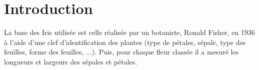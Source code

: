 \def\xxactivite{TD}
\def\xxauteur{\textsl{Xavier Pessoles}}

\def\xxnumchapitre{Chapitre 1 \vspace{.2cm}}
\def\xxchapitre{\hspace{.12cm} Introduction}


\def\xxtitreexo{Classification des Iris}
\def\xxsourceexo{\url{https://makina-corpus.com/blog/metier/2017/initiation-au-machine-learning-avec-python-pratique}}

\def\xxcompetences{%
\textsl{%
\textbf{Savoirs et compétences :}\\
\begin{itemize}[label=\ding{112},font=\color{ocre}] 
\item A voir
\end{itemize}
}}



\def\xxfigures{
\texttt{[image: fig\_01]}
}%

\iflivret

\else

\fi
\setlength{\columnseprule}{.1pt}

\vspace{4cm}
\pagestyle{fancy}
\thispagestyle{plain}


\section{Introduction}

La base des Iris utilisée est celle réalisée par un botaniste, Ronald Fisher, en 1936 à l'aide d'une clef d'identification des plantes (type de pétales, sépale, type des feuilles, forme des feuilles, ...). Puis, pour chaque fleur classée il a mesuré les longueurs et largeurs des sépales et pétales.

